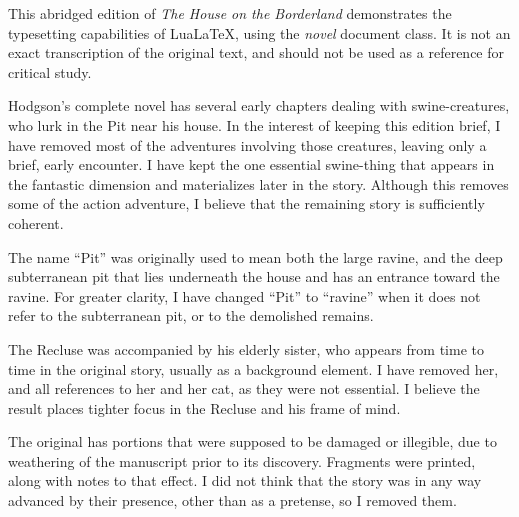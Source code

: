 \documentclass{novel} %
\begin{document}
\thispagestyle{empty} %
\label{ch:foreword}
\begin{ChapterStart}
\null\null
{}
\end{ChapterStart}
This abridged edition of \textit{The House on the Borderland} demonstrates the typesetting capabilities of LuaLaTeX, using the \textit{novel} document class. It is not an exact transcription of the original text, and should not be used as a reference for critical study.\par
Hodgson’s complete novel has several early chapters dealing with swine-creatures, who lurk in the Pit near his house. In the interest of keeping this edition brief, I have removed most of the adventures involving those creatures, leaving only a brief, early encounter. I have kept the one essential swine-thing that appears in the fantastic dimension and materializes later in the story. Although this removes some of the action adventure, I believe that the remaining story is sufficiently coherent.\par
The name “Pit” was originally used to mean both the large ravine, and the deep subterranean pit that lies underneath the house and has an entrance toward the ravine. For greater clarity, I have changed “Pit” to “ravine” when it does not refer to the subterranean pit, or to the demolished remains.\par
The Recluse was accompanied by his elderly sister, who appears from time to time in the original story, usually as a background element. I have removed her, and all references to her and her cat, as they were not essential. I believe the result places tighter focus in the Recluse and his frame of mind.\par
The original has portions that were supposed to be damaged or illegible, due to weathering of the manuscript prior to its discovery. Fragments were printed, along with notes to that effect. I did not think that the story was in any way advanced by their presence, other than as a pretense, so I removed them.\par
\end{document}
